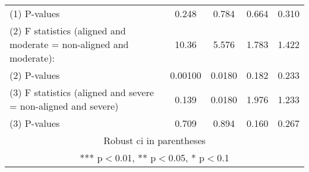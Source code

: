 \begin{tabular}{lcccc}
(1) \hspace{1mm} P-values & 0.248 & 0.784 & 0.664 & 0.310 \\
(2) F statistics (aligned and moderate = non-aligned and moderate): & 10.36 & 5.576 & 1.783 & 1.422 \\
(2) \hspace{1mm} P-values & 0.00100 & 0.0180 & 0.182 & 0.233 \\
(3) F statistics (aligned and severe = non-aligned and severe) & 0.139 & 0.0180 & 1.976 & 1.233 \\
 (3) \hspace{1mm} P-values & 0.709 & 0.894 & 0.160 & 0.267 \\ \hline
\multicolumn{5}{c}{ Robust ci in parentheses} \\
\multicolumn{5}{c}{ *** p$<$0.01, ** p$<$0.05, * p$<$0.1} \\
\end{tabular}
